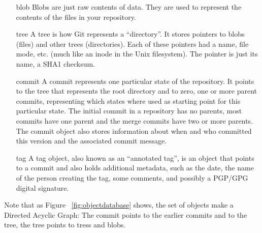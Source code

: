 \begin{frame}[fragile]
{    \begin{enumerate}
      \item[blob]{Blobs are just raw contents of data. They are used
        to represent the contents of the files in your repository.}
      \item[tree]{A tree is how Git represents a ``directory''.
	It stores pointers to blobs (files) and other trees
	(directories).  Each of these pointers had a name, file
	mode, etc. (much like an inode in the Unix filesystem).
	The pointer is just its name, a SHA1 checksum.}
      \item[commit]{A commit represents one particular state of the
        repository. It points to the tree that represents the root
        directory and to zero, one or more parent commits,
        representing which states where used as starting point for
        this particular state. The initial commit in a repository has
        no parents, most commits have one parent and the merge commits
        have two or more parents. The commit object also stores
	information about when and who committed this version and
	the associated commit message.}
      \item[tag]{A tag object, also known as an ``annotated tag'', is an
        object that points to a commit and also holds additional
        metadata, such as the date, the name of the person creating
        the tag, some comments, and possibly a PGP/GPG digital
        signature.}
    \end{enumerate}

    Note that as Figure ~\ref{fig:objectdatabase} shows, the set of
    objects make a Directed Acyclic Graph: The commit points to the
    earlier commits and to the tree, the tree points to tress and
    blobs.

    }





\end{frame}
